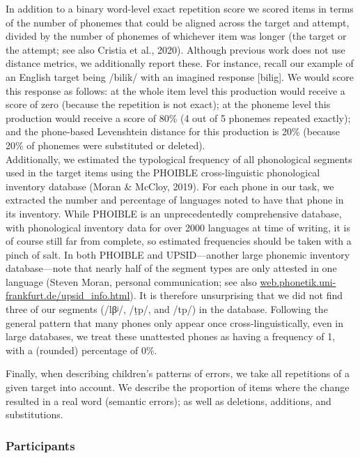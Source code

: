 \documentclass[english,,man,floatsintext]{apa6}
\begin{document}
In addition to a binary word-level exact repetition score we scored items in terms of the number of phonemes that could be aligned across the target and attempt, divided by the number of phonemes of whichever item was longer (the target or the attempt; see also Cristia et al., 2020). Although previous work does not use distance metrics, we additionally report these. For instance, recall our example of an English target being /bilik/ with an imagined response {[}bilig{]}. We would score this response as follows: at the whole item level this production would receive a score of zero (because the repetition is not exact); at the phoneme level this production would receive a score of 80\% (4 out of 5 phonemes repeated exactly); and the phone-based Levenshtein distance for this production is 20\% (because 20\% of phonemes were substituted or deleted).\\

Additionally, we estimated the typological frequency of all phonological segments used in the target items using the PHOIBLE cross-linguistic phonological inventory database (Moran \& McCloy, 2019). For each phone in our task, we extracted the number and percentage of languages noted to have that phone in its inventory. While PHOIBLE is an unprecedentedly comprehensive database, with phonological inventory data for over 2000 languages at time of writing, it is of course still far from complete, so estimated frequencies should be taken with a pinch of salt. In both PHOIBLE and UPSID---another large phonemic inventory database---note that nearly half of the segment types are only attested in one language (Steven Moran, personal communication; see also \href{http://web.phonetik.uni-frankfurt.de/upsid_info.html}{web.phonetik.uni-frankfurt.de/upsid\_info.html}). It is therefore unsurprising that we did not find three of our segments (/lβʲ/, /ṭp/, and /tp/) in the database. Following the general pattern that many phones only appear once cross-linguistically, even in large databases, we treat these unattested phones as having a frequency of 1, with a (rounded) percentage of 0\%.

Finally, when describing children's patterns of errors, we take all repetitions of a given target into account. We describe the proportion of items where the change resulted in a real word (semantic errors); as well as deletions, additions, and substitutions.

\hypertarget{participants}{%
\subsubsection{Participants}\label{participants}}
\end{document}
